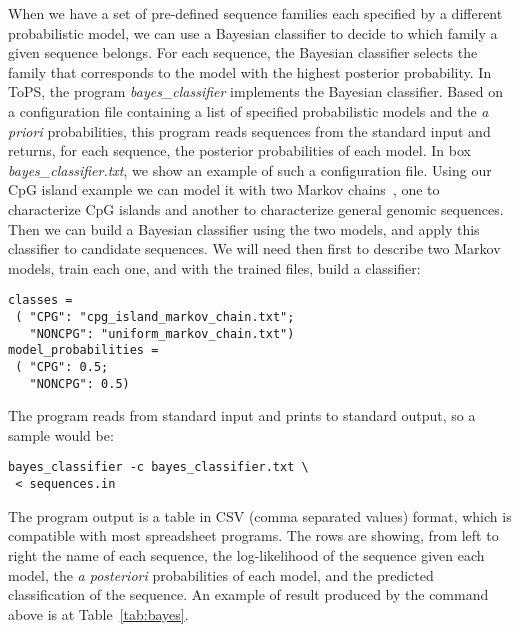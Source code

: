 When we have a set of pre-defined sequence families each specified by a different probabilistic model, we can use a Bayesian classifier to decide to which family a given sequence belongs.  For each sequence, the Bayesian classifier selects the family that corresponds to the model with the highest posterior probability. In ToPS, the program \textit{bayes\_classifier} implements the Bayesian classifier. Based on a configuration file containing a list of specified probabilistic models and the {\it a priori} probabilities,  this program reads sequences from the standard input and returns, for each sequence, the posterior probabilities of each model. In box \textit{bayes\_classifier.txt}, we show an example of such a configuration file. Using our CpG island example we can model it with two Markov chains~\cite{Durbin1998}, one to characterize CpG islands and another to characterize general genomic sequences. Then we can build a Bayesian classifier using the two models, and apply this classifier to candidate sequences. We will need then first to describe two Markov models, train each one, and with the trained files, build a classifier:

\vspace{1em}
\begin{Verbatim}[frame=single,  label={bayes\_classifier.txt}]
classes =
 ( "CPG": "cpg_island_markov_chain.txt";
   "NONCPG": "uniform_markov_chain.txt")
model_probabilities =
 ( "CPG": 0.5;
   "NONCPG": 0.5)
\end{Verbatim}

\vspace{1em}

The program reads from standard input and prints to standard output, so a sample would be:

\begin{Verbatim}[frame=single, label={Command line}]
bayes_classifier -c bayes_classifier.txt \
 < sequences.in
\end{Verbatim}

The program output is a table in CSV (comma separated values) format, which is compatible with most spreadsheet programs. The rows are showing, from left to right the name of each sequence, the log-likelihood of the sequence given each model, the \textit{a posteriori} probabilities of each model, and the predicted classification of the sequence. An example of result produced by the command above is at Table~\ref{tab:bayes}.

\begin{table}
 \caption{An example of \textit{ bayesian\_classifier}'s output.}
 \label{tab:bayes}
\end{table}



